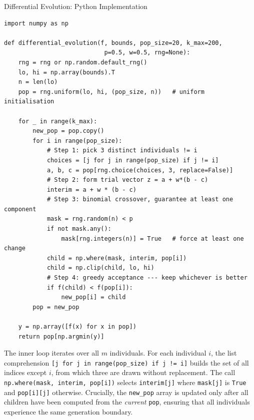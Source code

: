 \documentclass[aspectratio=169,10pt]{beamer}
\begin{document}
\begin{frame}[fragile]{Differential Evolution: Python Implementation}
\begin{lstlisting}[style=python, caption={Differential Evolution DE/rand/1/bin (Python / NumPy)}]
import numpy as np

def differential_evolution(f, bounds, pop_size=20, k_max=200,
                            p=0.5, w=0.5, rng=None):
    rng = rng or np.random.default_rng()
    lo, hi = np.array(bounds).T
    n = len(lo)
    pop = rng.uniform(lo, hi, (pop_size, n))   # uniform initialisation

    for _ in range(k_max):
        new_pop = pop.copy()
        for i in range(pop_size):
            # Step 1: pick 3 distinct individuals != i
            choices = [j for j in range(pop_size) if j != i]
            a, b, c = pop[rng.choice(choices, 3, replace=False)]
            # Step 2: form trial vector z = a + w*(b - c)
            interim = a + w * (b - c)
            # Step 3: binomial crossover, guarantee at least one component
            mask = rng.random(n) < p
            if not mask.any():
                mask[rng.integers(n)] = True   # force at least one change
            child = np.where(mask, interim, pop[i])
            child = np.clip(child, lo, hi)
            # Step 4: greedy acceptance --- keep whichever is better
            if f(child) < f(pop[i]):
                new_pop[i] = child
        pop = new_pop

    y = np.array([f(x) for x in pop])
    return pop[np.argmin(y)]
\end{lstlisting}

  The inner loop iterates over all $m$ individuals.  For each
  individual $i$, the list comprehension
  \texttt{[j for j in range(pop\_size) if j != i]} builds the set
  of all indices except $i$, from which three are drawn without
  replacement.  The call \texttt{np.where(mask, interim, pop[i])}
  selects \texttt{interim[j]} where \texttt{mask[j]} is \texttt{True}
  and \texttt{pop[i][j]} otherwise.  Crucially, the \texttt{new\_pop}
  array is updated only after all children have been computed from
  the \emph{current} \texttt{pop}, ensuring that all individuals
  experience the same generation boundary.

\end{frame}
\end{document}
